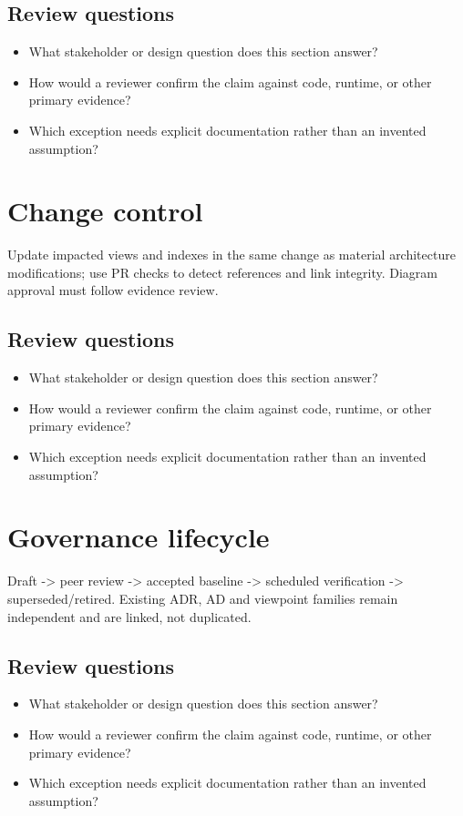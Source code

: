 \documentclass[10pt,letterpaper]{article}
\begin{document}
\subsection{Review questions}
\begin{itemize}
\item What stakeholder or design question does this section answer?
\item How would a reviewer confirm the claim against code, runtime, or other primary evidence?
\item Which exception needs explicit documentation rather than an invented assumption?
\end{itemize}

\section{Change control}
Update impacted views and indexes in the same change as material architecture modifications; use PR checks to detect references and link integrity. Diagram approval must follow evidence review.


\subsection{Review questions}
\begin{itemize}
\item What stakeholder or design question does this section answer?
\item How would a reviewer confirm the claim against code, runtime, or other primary evidence?
\item Which exception needs explicit documentation rather than an invented assumption?
\end{itemize}

\section{Governance lifecycle}
Draft -> peer review -> accepted baseline -> scheduled verification -> superseded/retired. Existing ADR, AD and viewpoint families remain independent and are linked, not duplicated.


\subsection{Review questions}
\begin{itemize}
\item What stakeholder or design question does this section answer?
\item How would a reviewer confirm the claim against code, runtime, or other primary evidence?
\item Which exception needs explicit documentation rather than an invented assumption?
\end{itemize}
\end{document}
